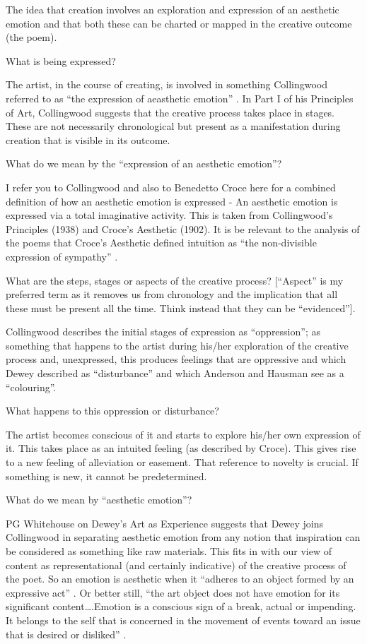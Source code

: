 The idea that creation involves an exploration and expression of an
aesthetic emotion and that both these can be charted or mapped in the
creative outcome (the poem).

What is being expressed?

The artist, in the course of creating, is involved in something
Collingwood referred to as ``the expression of aeasthetic emotion''
\cite[p. 117]{collingwood1958principles}. In Part I of his Principles
of Art, Collingwood suggests that the creative process takes place in
stages. These are not necessarily chronological but present as a
manifestation during creation that is visible in its outcome.

What do we mean by the ``expression of an aesthetic emotion''?

I refer you to Collingwood and also to Benedetto Croce here for a
combined definition of how an aesthetic emotion is expressed - An
aesthetic emotion is expressed via a total imaginative activity. This
is taken from Collingwood's Principles (1938) and Croce's Aesthetic
(1902).  It is be relevant to the analysis of the poems that Croce's
  Aesthetic defined intuition as ``the non-divisible expression of
  sympathy'' \cite[pp. 171--193]{kemp2003croce}.

What are the steps, stages or aspects of the creative process?
[``Aspect'' is my preferred term as it removes us from chronology and
  the implication that all these must be present all the time. Think
  instead that they can be ``evidenced''].

Collingwood describes the initial stages of expression as
``oppression''; as something that happens to the artist during his/her
exploration of the creative process and, unexpressed, this produces
feelings that are oppressive and which Dewey described as
``disturbance'' and which Anderson and Hausman see as a ``colouring''.

What happens to this oppression or disturbance?

The artist becomes conscious of it and starts to explore his/her own
expression of it. This takes place as an intuited feeling (as
described by Croce). This gives rise to a new feeling of alleviation
or easement. That reference to novelty is crucial. If something is
new, it cannot be predetermined.

What do we mean by ``aesthetic emotion''?

PG Whitehouse on Dewey's Art as Experience suggests that Dewey joins
Collingwood in separating aesthetic emotion from any notion that
inspiration can be considered as something like raw materials. This
fits in with our view of content as representational (and certainly
indicative) of the creative process of the poet. So an emotion is
aesthetic when it ``adheres to an object formed by an expressive act''
\cite[pp. 149--156]{whitehouse1978meaning}.  Or better still, ``the art
object does not have emotion for its significant content\ldots.Emotion
is a conscious sign of a break, actual or impending. It belongs to the
self that is concerned in the movement of events toward an issue that
is desired or disliked'' \cite[p. 14]{dewey2005art}.

